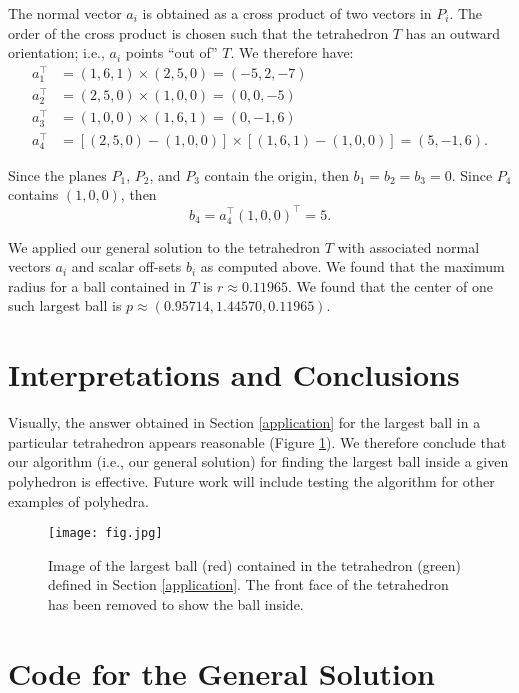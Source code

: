 \documentclass[12pt, a4paper, notitlepage]{report}
\renewcommand{\thesection}{\arabic{section}.  }
\begin{document}
The normal vector $a_i$ is obtained as a cross product of two vectors in $P_i$. The order of the cross product is chosen such that the tetrahedron $T$ has an outward orientation; i.e., $a_i$ points ``out of'' $T$. We therefore have:
\begin{align*}
a_1^\top &= (1,6,1)\times (2,5,0) = (-5,2,-7) \\
a_2^\top &= (2,5,0)\times (1,0,0) = (0,0,-5) \\
a_3^\top &= (1,0,0)\times (1,6,1) = (0,-1,6) \\
a_4^\top &= [(2,5,0)-(1,0,0)]\times [(1,6,1)-(1,0,0)] = (5,-1,6).
\end{align*}

Since the planes $P_1$, $P_2$, and $P_3$ contain the origin, then $b_1=b_2=b_3=0$. Since $P_4$ contains $(1,0,0)$, then
\[ b_4 = a_4^\top (1,0,0)^\top = 5. \]

We applied our general solution to the tetrahedron $T$ with associated normal vectors $a_i$ and scalar off-sets $b_i$ as computed above. We found that the maximum radius for a ball contained in $T$ is $r\approx 0.11965$. We found that the center of one such largest ball is $p\approx (0.95714, 1.44570, 0.11965)$.

\section{Interpretations and Conclusions}

Visually, the answer obtained in Section \ref{application} for the largest ball in a particular tetrahedron appears reasonable (Figure \ref{figure}). We therefore conclude that our algorithm (i.e., our general solution) for finding the largest ball inside a given polyhedron is effective. Future work will include testing the algorithm for other examples of polyhedra.

\begin{figure}
\centering
\texttt{[image: fig.jpg]}
\caption{\label{figure} Image of the largest ball (red) contained in the tetrahedron (green) defined in Section \ref{application}. The front face of the tetrahedron has been removed to show the ball inside.}
\end{figure}


\appendix
\renewcommand{\thesection}{A\arabic{section}.  }

\section{Code for the General Solution} \label{code}

\end{document}

